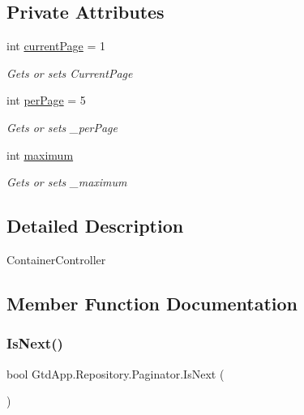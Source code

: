 \subsection*{Private Attributes}
\begin{DoxyCompactItemize}
\item 
int \mbox{\hyperlink{class_gtd_app_1_1_repository_1_1_paginator_a37af977307f502cbdbc704a13262c638}{current\+Page}} = 1
\begin{DoxyCompactList}\small\item\em Gets or sets Current\+Page \end{DoxyCompactList}\item 
int \mbox{\hyperlink{class_gtd_app_1_1_repository_1_1_paginator_a40b221a135d8bb7b095653e2b1b52328}{per\+Page}} = 5
\begin{DoxyCompactList}\small\item\em Gets or sets \+\_\+per\+Page \end{DoxyCompactList}\item 
int \mbox{\hyperlink{class_gtd_app_1_1_repository_1_1_paginator_a8c4477dc82c01db4cf89fbd18aeb4482}{maximum}}
\begin{DoxyCompactList}\small\item\em Gets or sets \+\_\+maximum \end{DoxyCompactList}\end{DoxyCompactItemize}


\subsection{Detailed Description}
Container\+Controller 



\subsection{Member Function Documentation}
\mbox{\label{class_gtd_app_1_1_repository_1_1_paginator_a16f01f9dcbe513466fb415b8cd3ca094}} 
\subsubsection{\texorpdfstring{Is\+Next()}{IsNext()}}
{\footnotesize\ttfamily bool Gtd\+App.\+Repository.\+Paginator.\+Is\+Next (\begin{DoxyParamCaption}{ }\end{DoxyParamCaption})}



